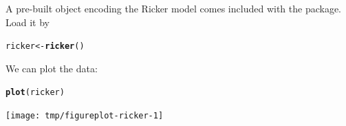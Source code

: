 \documentclass{beamer}\usepackage[]{graphicx}\usepackage[]{color}
\makeatletter
\newcommand{\hlstd}[1]{\textcolor[rgb]{0.345,0.345,0.345}{#1}}%
\newcommand{\hlkwb}[1]{\textcolor[rgb]{0.69,0.353,0.396}{#1}}%
\newcommand{\hlkwd}[1]{\textcolor[rgb]{0.737,0.353,0.396}{\textbf{#1}}}%
\newenvironment{kframe}{%
 \def\at@end@of@kframe{}%
 \ifinner\ifhmode%
  \def\at@end@of@kframe{\end{minipage}}%
  \begin{minipage}{\columnwidth}%
 \fi\fi%
 \def\FrameCommand##1{\hskip\@totalleftmargin \hskip-\fboxsep
 \colorbox{shadecolor}{##1}\hskip-\fboxsep
     \hskip-\linewidth \hskip-\@totalleftmargin \hskip\columnwidth}%
 \MakeFramed {\advance\hsize-\width
   \@totalleftmargin\z@ \linewidth\hsize
   \@setminipage}}%
 {\par\unskip\endMakeFramed%
 \at@end@of@kframe}
\newenvironment{knitrout}{}{} %
\makeatother
\begin{document}
\begin{frame}[fragile]
\bi
\item A pre-built  object encoding the Ricker model comes included with the package.
Load it by
\ei

\begin{knitrout}\small
{}\color{fgcolor}\begin{kframe}
\begin{alltt}
\hlstd{ricker} \hlkwb{<-} \hlkwd{ricker}\hlstd{()}
\end{alltt}
\end{kframe}
\end{knitrout}

We can plot the data:
\begin{knitrout}\small
{}\color{fgcolor}\begin{kframe}
\begin{alltt}
\hlkwd{plot}\hlstd{(ricker)}
\end{alltt}
\end{kframe}
\end{knitrout}

\vspace{-15mm}

\begin{knitrout}\small
{}\color{fgcolor}

{\centering \texttt{[image: tmp/figureplot-ricker-1]} 

}



\end{knitrout}

\end{frame}
\end{document}
